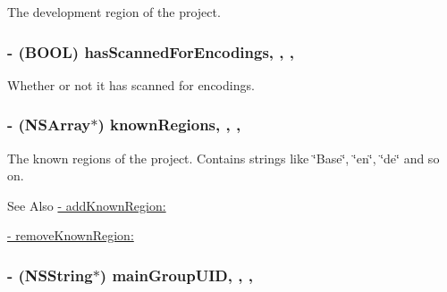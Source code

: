 The development region of the project. \hypertarget{interface_f_f_x_c_project_a0aa4bdd6f5fc15fec79751b719d54476}{
\subsubsection[{has\-Scanned\-For\-Encodings}]{\setlength{\rightskip}{0pt plus 5cm}-\/ (B\-O\-O\-L) has\-Scanned\-For\-Encodings\hspace{0.3cm}{\ttfamily [read]}, {\ttfamily [write]}, {\ttfamily [nonatomic]}, {\ttfamily [assign]}}}\label{interface_f_f_x_c_project_a0aa4bdd6f5fc15fec79751b719d54476}
Whether or not it has scanned for encodings. \hypertarget{interface_f_f_x_c_project_a6ec43b9b918228add371b4e4786fa502}{
\subsubsection[{known\-Regions}]{\setlength{\rightskip}{0pt plus 5cm}-\/ (N\-S\-Array$\ast$) known\-Regions\hspace{0.3cm}{\ttfamily [read]}, {\ttfamily [write]}, {\ttfamily [nonatomic]}, {\ttfamily [strong]}}}\label{interface_f_f_x_c_project_a6ec43b9b918228add371b4e4786fa502}
The known regions of the project. Contains strings like \char`\"{}\-Base\char`\"{}, \char`\"{}en\char`\"{}, \char`\"{}de\char`\"{} and so on. \begin{DoxySeeAlso}{See Also}
\hyperlink{interface_f_f_x_c_project_aefa164609ff9c5c0317e7f9785c35a36}{-\/ add\-Known\-Region\-:} 

\hyperlink{interface_f_f_x_c_project_a434ac2854fe2423d479770bf1b63cea3}{-\/ remove\-Known\-Region\-:} 
\end{DoxySeeAlso}
\hypertarget{interface_f_f_x_c_project_ac13e797d53235cb498c07537c392486b}{
\subsubsection[{main\-Group\-U\-I\-D}]{\setlength{\rightskip}{0pt plus 5cm}-\/ (N\-S\-String$\ast$) main\-Group\-U\-I\-D\hspace{0.3cm}{\ttfamily [read]}, {\ttfamily [write]}, {\ttfamily [nonatomic]}, {\ttfamily [strong]}}}\label{interface_f_f_x_c_project_ac13e797d53235cb498c07537c392486b}
